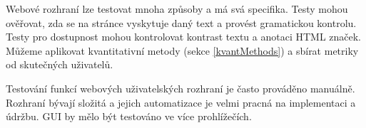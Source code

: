 Webové rozhraní lze testovat mnoha způsoby a má svá specifika.
Testy mohou ověřovat, zda se na stránce vyskytuje daný text a provést gramatickou kontrolu.
Testy pro dostupnost mohou kontrolovat kontrast textu a anotaci HTML značek.
Můžeme aplikovat kvantitativní metody (sekce \ref{kvantMethods}) a sbírat metriky od skutečných uživatelů.

Testování funkcí webových uživatelských rozhraní je často prováděno manuálně.
Rozhraní bývají složitá a jejich automatizace je velmi pracná na implementaci a údržbu. 
GUI by mělo být testováno ve více prohlížečích.

